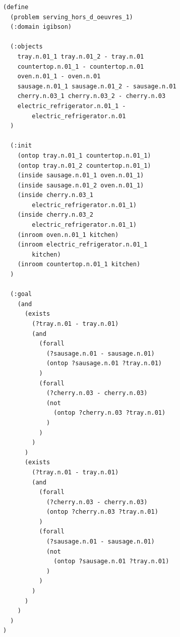 \begin{minipage}[t]{.47\textwidth}
\begin{lstlisting}[style=mystyle, caption={{\texttt{ServingHorsDoeuvres}}}, label={lst:bddl2}]
(define 
  (problem serving_hors_d_oeuvres_1)
  (:domain igibson)

  (:objects
    tray.n.01_1 tray.n.01_2 - tray.n.01
    countertop.n.01_1 - countertop.n.01
    oven.n.01_1 - oven.n.01
    sausage.n.01_1 sausage.n.01_2 - sausage.n.01
    cherry.n.03_1 cherry.n.03_2 - cherry.n.03
    electric_refrigerator.n.01_1 - 
        electric_refrigerator.n.01
  )
    
  (:init 
    (ontop tray.n.01_1 countertop.n.01_1)
    (ontop tray.n.01_2 countertop.n.01_1)
    (inside sausage.n.01_1 oven.n.01_1)
    (inside sausage.n.01_2 oven.n.01_1)
    (inside cherry.n.03_1 
        electric_refrigerator.n.01_1)
    (inside cherry.n.03_2 
        electric_refrigerator.n.01_1)
    (inroom oven.n.01_1 kitchen)
    (inroom electric_refrigerator.n.01_1 
        kitchen)
    (inroom countertop.n.01_1 kitchen)
  )

  (:goal
    (and
      (exists
        (?tray.n.01 - tray.n.01)
        (and
          (forall
            (?sausage.n.01 - sausage.n.01)
            (ontop ?sausage.n.01 ?tray.n.01)
          )
          (forall
            (?cherry.n.03 - cherry.n.03)
            (not
              (ontop ?cherry.n.03 ?tray.n.01)
            )
          )
        )
      )
      (exists
        (?tray.n.01 - tray.n.01)
        (and
          (forall
            (?cherry.n.03 - cherry.n.03)
            (ontop ?cherry.n.03 ?tray.n.01)
          )
          (forall
            (?sausage.n.01 - sausage.n.01)
            (not
              (ontop ?sausage.n.01 ?tray.n.01)
            )
          )
        )
      )
    )
  )
)
\end{lstlisting}
\end{minipage}